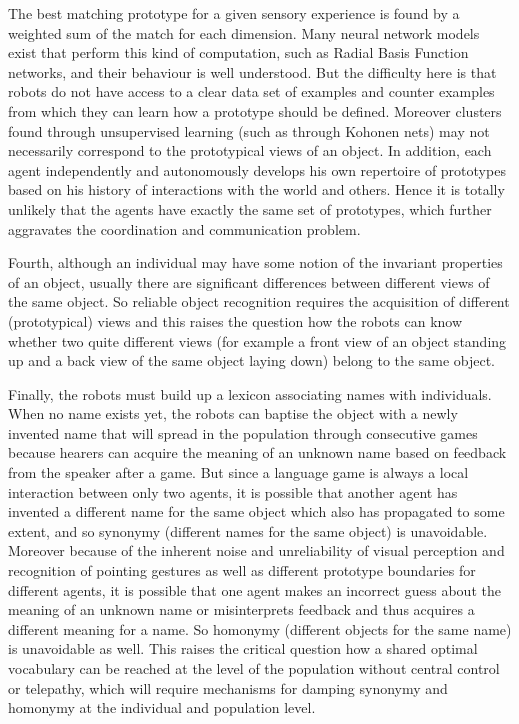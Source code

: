 The best matching prototype for a given sensory experience is  
found by a weighted sum of the match for each dimension. Many neural network models exist that perform this kind
of computation, such as Radial Basis Function networks, and their behaviour is well
understood. But the difficulty here is that robots do not have access
to a clear data set of examples and counter examples from which they
can learn how a prototype should be defined. Moreover clusters found
through unsupervised learning (such as through Kohonen
nets) may not necessarily correspond to the prototypical
views of an object. In addition, each agent independently and autonomously
develops his own repertoire of prototypes based on his history of
interactions with the world and others. Hence it is totally unlikely
that the agents have exactly the same set of prototypes, which
further aggravates the coordination and communication problem. 

Fourth, although an individual may have some notion of the invariant properties
of an object, usually
there are significant differences between different views of the same
object. So reliable object recognition requires the acquisition of
different (prototypical) views and this raises the question how the
robots can know whether two quite different views (for example a front
view of an object standing up and a back view of the same object
laying down) belong to the same object. 

Finally, the robots must build up a lexicon associating names with individuals. When no name
exists yet, the robots can baptise the object with a newly invented name that
will spread in the population through consecutive games because
hearers can acquire the meaning of an unknown name based on feedback
from the speaker after a game. But since a language game is always a
local interaction between only two agents, it is possible that another
agent has invented a different name for the same object which also has
propagated to some extent, and so synonymy (different names for the
same object) is unavoidable. Moreover because of the inherent noise
and unreliability of visual perception and recognition of pointing
gestures as well as different prototype boundaries for different
agents, it is possible that one agent makes an incorrect guess about
the meaning of an unknown name or misinterprets feedback and thus
acquires a different meaning for a name. So homonymy (different
objects for the same name) is unavoidable as well. This raises the
critical question how a shared optimal vocabulary can be reached at
the level of the population without central control or telepathy,
which will require mechanisms for damping synonymy and homonymy at the
individual and population level.


